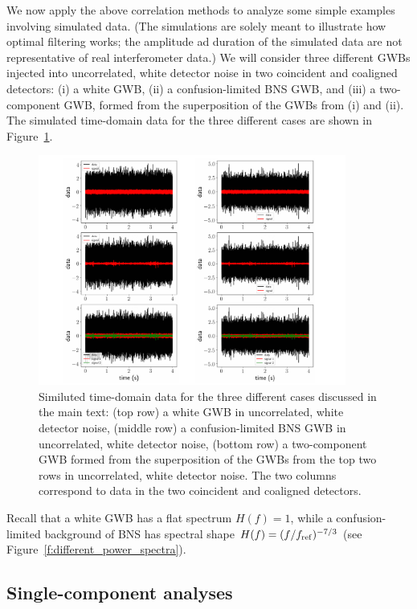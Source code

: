 \documentclass[11pt]{article}
\numberwithin{equation}{section}
\begin{document}
We now apply the above correlation methods to analyze 
some simple examples involving simulated data.%
(The simulations are solely meant to illustrate how 
optimal filtering works;
the amplitude ad duration of the simulated data are 
not representative of real interferometer data.)
We will consider three different GWBs injected into 
uncorrelated, white detector noise in two coincident
and coaligned detectors:
(i) a white GWB, 
(ii) a confusion-limited BNS GWB, 
and 
(iii) a two-component GWB, formed from the superposition
of the GWBs from (i) and (ii).
The simulated time-domain data for the three different 
cases are shown in Figure~\ref{f:simple_examples}.
%
\begin{figure}[htbp!]
\begin{center}
\includegraphics[width=0.9\textwidth]{Figures/simple_examples}
\caption{Similuted time-domain data for the three different
cases discussed in the main text:
(top row) a white GWB in uncorrelated, white detector noise,
(middle row) a confusion-limited BNS GWB in uncorrelated, 
white detector noise,
(bottom row) a two-component GWB formed from the superposition 
of the GWBs from the top two rows in uncorrelated, white 
detector noise.
The two columns correspond to data in the two coincident
and coaligned detectors.}
\label{f:simple_examples}
\end{center}
\end{figure}
%
Recall that a white GWB has a flat spectrum $H(f)=1$, 
while a confusion-limited background of BNS has 
spectral shape $H(f)=(f/f_{\rm ref})^{-7/3}$ 
(see Figure~\ref{f:different_power_spectra}).

\subsection{Single-component analyses}
\end{document}
